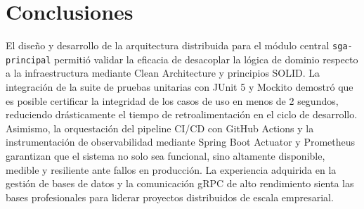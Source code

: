 \documentclass[11pt,a4paper]{article}
\begin{document}
\section{Conclusiones}

El diseño y desarrollo de la arquitectura distribuida para el módulo central \texttt{sga-principal} permitió validar la eficacia de desacoplar la lógica de dominio respecto a la infraestructura mediante Clean Architecture y principios SOLID. La integración de la suite de pruebas unitarias con JUnit 5 y Mockito demostró que es posible certificar la integridad de los casos de uso en menos de 2 segundos, reduciendo drásticamente el tiempo de retroalimentación en el ciclo de desarrollo. Asimismo, la orquestación del pipeline CI/CD con GitHub Actions y la instrumentación de observabilidad mediante Spring Boot Actuator y Prometheus garantizan que el sistema no solo sea funcional, sino altamente disponible, medible y resiliente ante fallos en producción. La experiencia adquirida en la gestión de bases de datos y la comunicación gRPC de alto rendimiento sienta las bases profesionales para liderar proyectos distribuidos de escala empresarial.
\end{document}

